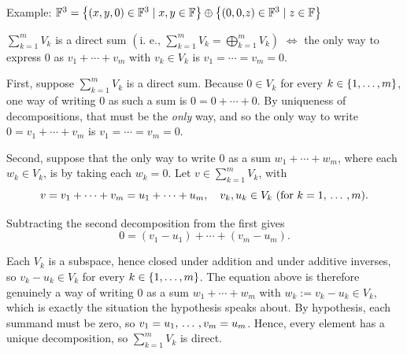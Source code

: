 \begin{example}
  Example: $\mathbb{F}^3 =
  \left \{ \left ( x, y, 0 \right ) \in \mathbb{F}^3 \mid x,y \in \mathbb{F} \right \}
  \oplus
  \left \{ \left (  0, 0, \phantom{y} \!\!\!\! z  \right ) \in \mathbb{F}^3 \mid z \in \mathbb{F} \right \}$
\end{example}


\setcounter{thm}{44}
\begin{thm} 
  \label{thm: condition for a direct sum}
  $\sum_{k=1}^m V_k$ is a direct sum $\left(\text{i. e., }\sum_{k=1}^m V_k = \bigoplus_{k=1}^m V_k\right)$ $\iff$ the only way to express $0$ as $v_1 + \cdots + v_m$ with $v_k \in V_k$ is $v_1 = \cdots = v_m = 0$.
\end{thm}
\begin{prf}
    \Rightarrowdirection
    First, suppose $\sum_{k=1}^m V_k$ is a direct sum.
    Because $0 \in V_k$ for every $k \in \{1, \dots, m \}$, one way of writing $0$ as such a sum is $0 = 0 + \cdots + 0$.
    By uniqueness of decompositions, that must be the \emph{only} way, and so the only way to write $0 = v_1 + \cdots + v_m$ is $v_1 = \cdots = v_m = 0$.

    \Leftarrowdirection Second, suppose that the only way to write $0$ as a sum $w_1 + \cdots + w_m$, where each $w_k \in V_k$, is by taking each $w_k = 0$. Let $v \in \sum_{k=1}^m V_k$, with
    \begin{equation}
        v = v_1 + \cdots + v_m = u_1 + \cdots + u_m, \quad v_k, u_k \in V_k \text{ (for } k=1, {\, \ldots \,\,}, m).
    \end{equation}

    Subtracting the second decomposition from the first gives
    \begin{equation}
      0= (v_1-u_1)+\cdots+(v_m-u_m).
    \end{equation}

    Each $V_k$ is a subspace, hence closed under addition and under additive inverses, so $v_k - u_k \in V_k$ for every $k \in \{1, \dots, m \}$. The equation above is therefore genuinely a way of writing $0$ as a sum $w_1 + \cdots + w_m$ with $w_k := v_k - u_k \in V_k$, which is exactly the situation the hypothesis speaks about.
    By hypothesis, each summand must be zero, so $v_1=u_1, {\, \ldots \,\,}, v_m=u_m$.
    Hence, every element has a unique decomposition, so $\sum_{k=1}^m V_k$ is direct.
\end{prf}

